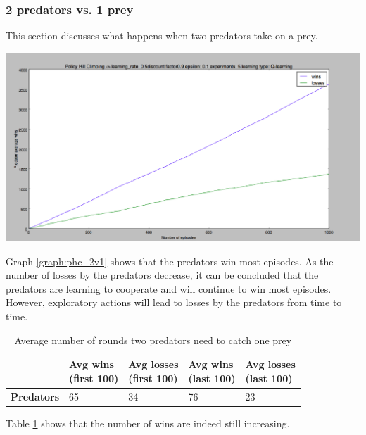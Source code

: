 \subsubsection{2 predators vs. 1 prey}
This section discusses what happens when two predators take on a prey.

\begin{center}
	\includegraphics[scale=0.3]{hillclimbing1000times5step01}
	\label{graph:phc_2v1}
\end{center}

Graph \ref{graph:phc_2v1} shows that the predators win most episodes. As the number of losses by the predators decrease, it can be concluded that the predators are learning to cooperate and will continue to win most episodes. However, exploratory actions will lead to losses by the predators from time to time.

\begin{table}[H]
\begin{center}
\begin{tabular}{| l | l | l | l | l |}
\hline
 & \parbox{2cm}{\textbf{Avg wins \\ (first 100)}} & \parbox{2cm}{\textbf{Avg losses \\ (first 100)}} & \parbox{2cm}{\textbf{Avg wins \\ (last 100)}} & \parbox{2cm}{\textbf{Avg losses \\ (last 100)}} \\
\hline
\textbf{Predators} & 65 & 34 & 76 & 23 \\
\hline
\end{tabular}
\caption{Average number of rounds two predators need to catch one prey}
\label{table:2vs1}
\end{center}
\end{table}

Table \ref{table:2vs1} shows that the number of wins are indeed still increasing.